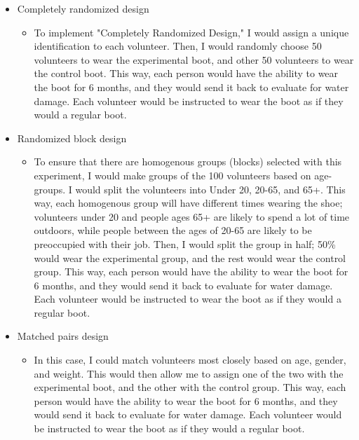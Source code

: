 \documentclass[letterpaper]{article}
\def\tightlist{}
\begin{document}
\begin{itemize}
\tightlist
\item
  Completely randomized design

  \begin{itemize}
  \tightlist
  \item
    To implement "Completely Randomized Design," I would assign a unique identification to each volunteer. Then, I would randomly choose 50 volunteers to wear the experimental boot, and other 50 volunteers to wear the control boot. This way, each person would have the ability to wear the boot for 6 months, and they would send it back to evaluate for water damage. Each volunteer would be instructed to wear the boot as if they would a regular boot.\\
  \end{itemize}
\item
  Randomized block design

  \begin{itemize}
  \tightlist
  \item
    To ensure that there are homogenous groups (blocks) selected with this experiment, I would make groups of the 100 volunteers based on age-groups. I would split the volunteers into Under 20, 20-65, and 65+. This way, each homogenous group will have different times wearing the shoe; volunteers under 20 and people ages 65+ are likely to spend a lot of time outdoors, while people between the ages of 20-65 are likely to be preoccupied with their job. Then, I would split the group in half; 50\% would wear the experimental group, and the rest would wear the control group. This way, each person would have the ability to wear the boot for 6 months, and they would send it back to evaluate for water damage. Each volunteer would be instructed to wear the boot as if they would a regular boot.\\
  \end{itemize}
\item
  Matched pairs design

  \begin{itemize}
  \tightlist
  \item
    In this case, I could match volunteers most closely based on age, gender, and weight. This would then allow me to assign one of the two with the experimental boot, and the other with the control group. This way, each person would have the ability to wear the boot for 6 months, and they would send it back to evaluate for water damage. Each volunteer would be instructed to wear the boot as if they would a regular boot.
  \end{itemize}
\end{itemize}
\end{document}
